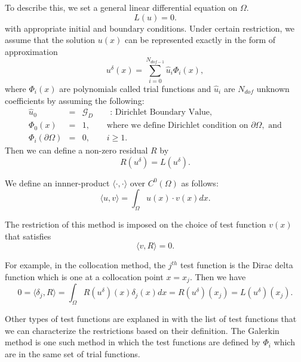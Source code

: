 To describe this, we set a general linear differential equation on $\Omega$.
\begin{equation}
\label{pde1} L(u) = 0.
\end{equation}
with appropriate initial and boundary conditions. Under certain restriction, we assume that the solution $u(x)$ can be represented exactly in the form of approximation
\begin{equation}
\label{sol1} u^{\delta}(x) = \sum_{i=0}^{N_{dof-1}} \hat u_i \Phi_i(x),
\end{equation}
where $\Phi_i(x)$ are polynomials called trial functions and $\hat u_i$ are $N_{dof}$ unknown coefficients by assuming the following:
\begin{eqnarray}
        \hat u_0  &=& \mathcal{G}_{D} \qquad \mbox{: Dirichlet Boundary Value}, \\
        \Phi_0(x) &=& 1, \qquad \mbox{where we define Dirichlet condition on }\partial\Omega, \mbox{ and}\\
    \Phi_i(\partial\Omega) &=& 0, \qquad i \ge 1.
\end{eqnarray}
Then we can define a non-zero residual $R$ by
\begin{equation}
R(u^{\delta}) = L(u^{\delta}).
\end{equation}

We define an innner-product $\langle \cdot, \cdot \rangle$ over $C^0(\Omega)$  as follows:
\begin{equation}
\label{functional}
\langle u, v \rangle = \int_{\Omega} u(x) \cdot v(x) dx.
\end{equation}

The restriction of this method is imposed on the choice of test function $v(x)$ that satisfies
\begin{equation}
\langle v, R \rangle = 0.
\end{equation}

For example, in the collocation method, the $j^{th}$ test function is the Dirac delta function which is one at a collocation point $x = x_j$. Then we have
\begin{equation}
0 = \langle \delta_j, R \rangle = \int_{\Omega} R(u^{\delta})(x)\delta_j(x)dx = R(u^{\delta})(x_j) = L(u^{\delta})(x_j).
\end{equation}

Other types of test functions are explaned in \cite{Karniadarkis} with the list of test functions that we can characterize the restrictions based on their definition. The Galerkin method is one such method in which the test functions are defined by $\Phi_i$ which are in the same set of trial functions.
